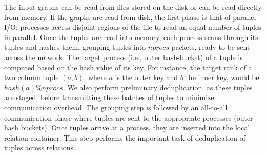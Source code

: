 The input graphs can be read from files stored on the disk or can be read directly from memory. If the graphs are read from disk, the first phase is that of parallel I/O: processes access disjoint regions of the file to read an equal number of tuples in parallel. Once the tuples are read into memory, each process scans through its tuples and hashes them, grouping tuples into $\mathit{nprocs}$ packets, ready to be sent across the network. The target process (i.e., outer hash-bucket) of a tuple is computed based on the hash value of its key. For instance, the target rank of a two column tuple $(a, b)$, where $a$ is the outer key and $b$ the inner key, would be $\mathit{hash}(a)\%\mathit{nprocs}$. We also perform preliminary deduplication, as these tuples are staged, before transmitting these batches of tuples to minimize communication overhead. The grouping step is followed by an all-to-all communication phase where tuples are sent to the appropriate processes (outer hash buckets). Once tuples arrive at a process, they are inserted into the local relation container. This step performs the important task of deduplication of tuples across relations. 

